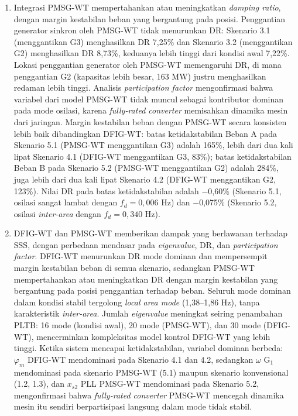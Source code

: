 \begin{enumerate}
\item Integrasi PMSG-WT mempertahankan atau meningkatkan \textit{damping
ratio}, dengan margin kestabilan beban yang bergantung pada posisi. Penggantian
generator sinkron oleh PMSG-WT tidak menurunkan DR: Skenario 3.1 (menggantikan
G3) menghasilkan DR 7,25\% dan Skenario 3.2 (menggantikan G2) menghasilkan DR
8,73\%, keduanya lebih tinggi dari kondisi awal 7,22\%. Lokasi penggantian
generator oleh PMSG-WT memengaruhi DR, di mana penggantian G2 (kapasitas lebih
besar, 163 MW) justru menghasilkan redaman lebih tinggi. Analisis
\textit{participation factor} mengonfirmasi bahwa variabel dari model PMSG-WT
tidak muncul sebagai kontributor dominan pada mode osilasi, karena
\textit{fully-rated converter} memisahkan dinamika mesin dari jaringan. Margin kestabilan beban dengan PMSG-WT secara konsisten lebih baik dibandingkan
DFIG-WT: batas ketidakstabilan Beban A pada Skenario 5.1 (PMSG-WT menggantikan
G3) adalah 165\%, lebih dari dua kali lipat Skenario 4.1 (DFIG-WT menggantikan
G3, 83\%); batas ketidakstabilan Beban B pada Skenario 5.2 (PMSG-WT menggantikan
G2) adalah 284\%, juga lebih dari dua kali lipat Skenario 4.2 (DFIG-WT
menggantikan G2, 123\%). Nilai DR pada batas ketidakstabilan adalah $-$0,60\%
(Skenario 5.1, osilasi sangat lambat dengan $f_d = 0{,}006$ Hz) dan $-$0,075\%
(Skenario 5.2, osilasi \textit{inter-area} dengan $f_d = 0{,}340$ Hz).

\item DFIG-WT dan PMSG-WT memberikan dampak yang berlawanan terhadap
SSS, dengan perbedaan mendasar pada \textit{eigenvalue}, DR, dan
\textit{participation factor}. DFIG-WT menurunkan DR mode dominan dan
mempersempit margin kestabilan beban di semua skenario, sedangkan PMSG-WT
mempertahankan atau meningkatkan DR dengan margin kestabilan yang bergantung pada
posisi penggantian terhadap beban. Seluruh mode dominan dalam kondisi stabil
tergolong \textit{local area mode} (1,38--1,86 Hz), tanpa karakteristik
\textit{inter-area}. Jumlah \textit{eigenvalue} meningkat seiring penambahan
PLTB: 16 mode (kondisi awal), 20 mode (PMSG-WT), dan 30 mode (DFIG-WT),
mencerminkan kompleksitas model kontrol DFIG-WT yang lebih tinggi. Ketika sistem
mencapai ketidakstabilan, variabel dominan berbeda: $\varphi_m$ DFIG-WT
mendominasi pada Skenario 4.1 dan 4.2, sedangkan $\omega$ G$_1$ mendominasi pada skenario PMSG-WT (5.1) maupun skenario
konvensional (1.2, 1.3), dan $x_{s2}$ PLL PMSG-WT mendominasi pada Skenario 5.2,
mengonfirmasi bahwa \textit{fully-rated converter} PMSG-WT mencegah dinamika mesin
itu sendiri berpartisipasi langsung dalam mode tidak stabil.

\end{enumerate}

